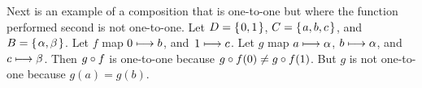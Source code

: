 \documentclass{test}  %
\begin{document}
\begin{problem}
\begin{exes}
\begin{answer}
  Next is an example of a composition that is one-to-one but where
  the function performed second is not one-to-one.
  Let $D=\mbox{$\{\hspace{0.1em}0,1\hspace{0.1em}\}$}$, $C=\mbox{$\{\hspace{0.1em}a,b,c\hspace{0.1em}\}$}$, and $B=\mbox{$\{\hspace{0.1em}\alpha, \beta\hspace{0.1em}\}$}$.
  Let $f$ map $0\stackrel{}{\longmapsto} b$, and~$1\stackrel{}{\longmapsto}c$.
  Let $g$ map $a\stackrel{}{\longmapsto} \alpha$, $b\stackrel{}{\longmapsto}\alpha$, 
  and~$c\stackrel{}{\longmapsto} \beta$. 
  Then $g\mathbin{\circ} f$ is one-to-one because 
  $g\mathbin{\circ} f(0)\neq g\mathbin{\circ} f(1)$.
  But $g$ is not one-to-one because $g(a)=g(b)$. 
\end{answer}
\end{exes}
  


\end{problem}
\end{document}
